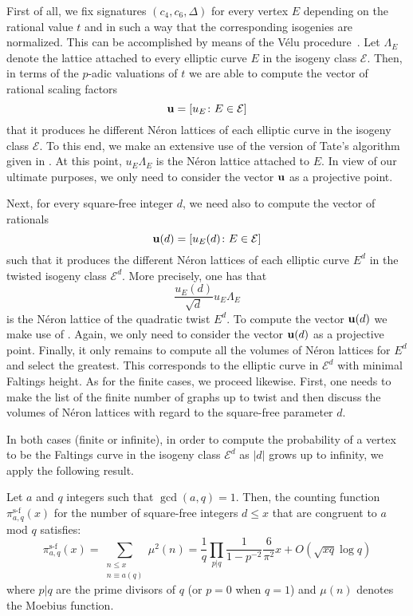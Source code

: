 \documentclass{ws-ijnt}
\begin{document}
First of all, we fix signatures $(c_4,c_6,\Delta)$ for every vertex $E$ depending on the rational value $t$ and in such a way that the corresponding isogenies are normalized. This can be accomplished by means of the Vélu procedure~\cite{V}. Let $\Lambda_E$ denote the lattice attached to every elliptic curve $E$ in the isogeny class $\mathcal{E}$. Then, in terms of the $p$-adic valuations of $t$ we are able to compute the vector of rational scaling factors 
\begin{equation}
{\bf u} = [ u_E \colon E \in \mathcal{E}]
\label{u}
\end{equation}
that it produces he different Néron lattices of each elliptic curve in the isogeny class $\mathcal{E}$.
To this end, we make an extensive use of the version of Tate's algorithm given in \cite{Papa}. 
At this point, $u_E \Lambda_E$ is the Néron lattice attached to $E$. In view of our ultimate purposes, we only need to consider the vector ${\bf u}$ as a projective point. 

Next, for every square-free integer $d$, we 
need also to compute the vector of rationals
\begin{equation}
{\bf u}(d) = [ u_E(d) \colon E \in \mathcal{E}]
\label{ud}
\end{equation}
such that it produces the different Néron lattices of each elliptic curve $E^d$ in the twisted isogeny class $\mathcal{E}^d$. More precisely, one has that 
\begin{equation}
\displaystyle{\frac{u_E(d)}{\sqrt{d}} u_E \Lambda_E}
\label{Neron_d}
\end{equation}
is the Néron lattice of the quadratic twist $E^d$.
To compute the vector ${\bf u}(d)$ we make use of 
\cite{Pal}. Again, we only need to consider
the vector ${\bf u}(d)$ as a projective point.
Finally, it only remains to compute all 
the volumes of Néron lattices for $E^d$ and select the greatest. This corresponds to the elliptic curve in $\mathcal{E}^d$ with minimal Faltings height. 
As for the finite cases, we proceed likewise. 
First, one needs to make the list of the finite number of graphs up to twist and then discuss the volumes of Néron lattices with regard to the square-free parameter $d$. 

In both cases (finite or infinite), in order to compute the probability of a vertex to be the Faltings curve in the isogeny class $\mathcal{E}^d$ as $|d|$ grows up to infinity, we apply the following result.

\begin{proposition}
\label{analyticNT}
Let $a$ and $q$ integers such that $\operatorname{gcd}(a,q)=1$. Then, the counting function $\pi_{a,q}^{\operatorname{{s-f}}}(x)$ for the 
number of square-free integers $d\leq x$ that are congruent to 
$a$ mod $q$ satisfies:
\begin{equation}
\displaystyle{
\pi_{a,q}^{\operatorname{{s-f}}}(x) = 
\sum_{\substack{ n\leq x \\ n \equiv a (q)}}
  \mu^2(n) = 
\frac{1}{q} 
\prod_{p|q} \frac{1}{1-p^{-2}}
\frac{6}{\pi^2} x + O(\sqrt{x q} \log q) }
\end{equation}
where $p|q$ are the prime divisors of $q$ 
(or $p=0$ when $q=1$) and $\mu(n)$ denotes the Moebius function.
\end{proposition}
\end{document}
